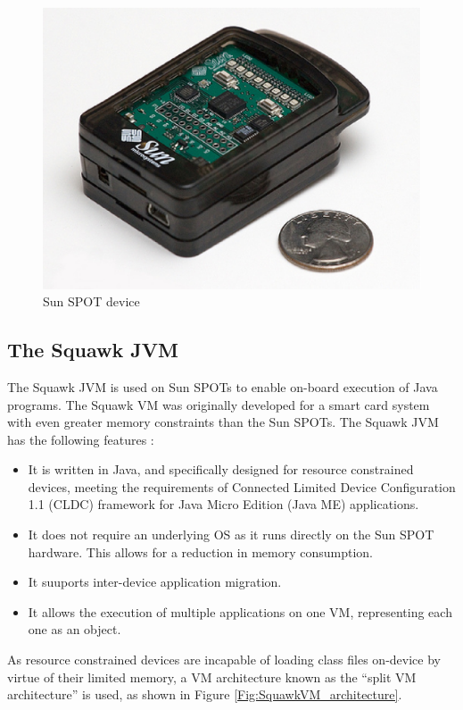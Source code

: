 \begin{figure} 
\centering
\includegraphics[scale=0.50]{img/sunspot1.eps} 
\caption[Sun SPOT device]{Sun SPOT device}
\label{Fig:SunSpot}
\end{figure} 


\subsection{The Squawk JVM}

The Squawk JVM is used on Sun SPOTs to enable on-board execution of Java
programs. The Squawk VM was originally developed for a smart card system with
even greater memory constraints than the Sun SPOTs. The Squawk JVM has the
following features \cite{simon_squawk:2006}:

\begin{itemize}
  \item It is written in Java, and specifically designed for resource
  constrained devices, meeting the requirements of Connected Limited Device
  Configuration 1.1 (CLDC) framework for Java Micro Edition (Java ME)
  applications.
  \item It does not require an underlying OS as it runs directly on the Sun
  SPOT hardware. This allows for a reduction in memory consumption.
  \item It suuports inter-device application migration.
  \item It allows the execution of multiple applications on one VM,
  representing each one as an object.
\end{itemize}

As resource constrained devices are incapable of loading class files on-device
by virtue of their limited memory, a VM architecture known as the ``split VM
architecture'' is used, as shown in Figure
\ref{Fig:SquawkVM_architecture}.

